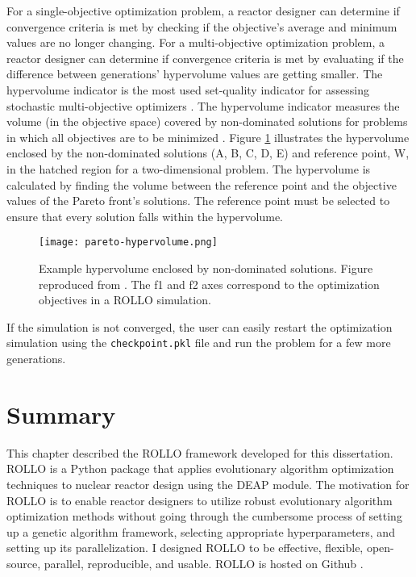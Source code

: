 For a single-objective optimization problem, a reactor designer can determine if 
convergence criteria is met by checking if the objective's average and minimum 
values are no longer changing. 
For a multi-objective optimization problem, a reactor designer can determine if 
convergence criteria is met by evaluating if the difference between generations' 
hypervolume values are getting smaller.
The hypervolume indicator is the most used set-quality indicator for assessing 
stochastic multi-objective optimizers \cite{guerreiro_hypervolume_2020}.
The hypervolume indicator measures the volume (in the objective space) covered by 
non-dominated solutions for problems in which all objectives are to be 
minimized \cite{deb_multi-objective_2001}.  
Figure \ref{fig:pareto_hypervolume} illustrates the hypervolume enclosed by the 
non-dominated solutions (A, B, C, D, E) and reference point, W, in the hatched region 
for a two-dimensional problem.
The hypervolume is calculated by finding the volume between the reference point and 
the objective values of the Pareto front's solutions. 
The reference point must be selected to ensure that every solution falls within 
the hypervolume.
\begin{figure}[htbp]
    \centering
    \texttt{[image: pareto-hypervolume.png]} 
    \caption{Example hypervolume enclosed by non-dominated solutions. Figure reproduced 
    from \cite{deb_multi-objective_2001}. 
    The f1 and f2 axes correspond to the optimization objectives in a \gls{ROLLO} 
    simulation. }
    \label{fig:pareto_hypervolume}
\end{figure}
If the simulation is not converged, the user can easily restart the optimization 
simulation using the \texttt{checkpoint.pkl} file and run the problem for a few more 
generations. 

\section{Summary}
This chapter described the \acrfull{ROLLO} framework developed for 
this dissertation. 
\gls{ROLLO} is a Python package that applies evolutionary algorithm 
optimization techniques to nuclear reactor design using the \acrfull{DEAP} 
module. 
The motivation for \gls{ROLLO} is to enable reactor designers to utilize 
robust evolutionary algorithm optimization methods without going 
through the cumbersome process of setting up a genetic algorithm framework,
selecting appropriate hyperparameters, and setting up its parallelization. 
I designed \gls{ROLLO} to be effective, flexible, open-source, parallel, 
reproducible, and usable. 
\gls{ROLLO} is hosted on Github \cite{chee_rollo_2021}. 